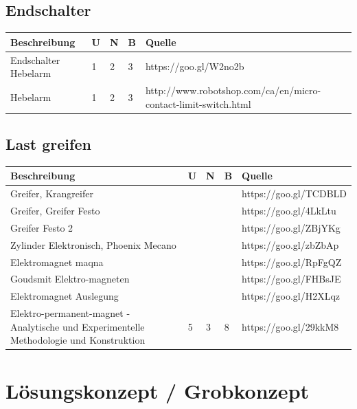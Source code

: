 \documentclass[a4paper]{report}
\begin{document}
\section{Endschalter}
\begin{tabular}{|p{}|p{}|p{}|p{}|p{}|}
	\hline
	\textbf{Beschreibung} & \textbf{U} & \textbf{N} & \textbf{B} & \textbf{Quelle} \\
	\hline
	Endschalter Hebelarm & 1 & 2 & 3 & https://goo.gl/W2no2b\\
	\hline
	Hebelarm & 1 & 2 & 3 & http://www.robotshop.com/ca/en/micro-contact-limit-switch.html\\
	\hline
\end{tabular}

\section{Last greifen}
\begin{tabular}{|p{}|p{}|p{}|p{}|p{}|}
	\hline
	\textbf{Beschreibung} & \textbf{U} & \textbf{N} & \textbf{B} & \textbf{Quelle} \\
	\hline
	Greifer, Krangreifer & & & & https://goo.gl/TCDBLD \\
	\hline
	Greifer, Greifer Festo & & & & https://goo.gl/4LkLtu\\
	\hline
	Greifer Festo 2 & & & & https://goo.gl/ZBjYKg\\
	\hline
	Zylinder Elektronisch, Phoenix Mecano & & & & https://goo.gl/zbZbAp\\
	\hline
	Elektromagnet maqna & & & & https://goo.gl/RpFgQZ\\
	\hline
	Goudsmit Elektro-magneten & & & & https://goo.gl/FHBsJE\\
	\hline
	Elektromagnet Auslegung & & & & https://goo.gl/H2XLqz\\
	\hline
	Elektro-permanent-magnet - Analytische und Experimentelle Methodologie und Konstruktion & 5 & 3 & 8 & https://goo.gl/29kkM8\\
  \hline
\end{tabular}

\chapter{Lösungskonzept / Grobkonzept}
\end{document}
